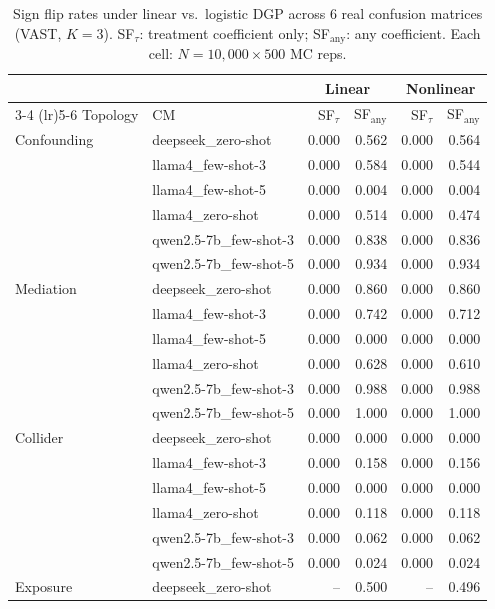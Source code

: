 \begin{table}[t]
\centering
\caption{Sign flip rates under linear vs.\ logistic DGP across 6 real confusion matrices (VAST, $K\!=\!3$). SF$_\tau$: treatment coefficient only; SF$_\text{any}$: any coefficient. Each cell: $N\!=\!10{,}000 \times 500$ MC reps.}
\label{tab:logistic-robustness}
\small\setlength{\tabcolsep}{3pt}
\begin{tabular}{llrrrr}
\toprule
 & & \multicolumn{2}{c}{Linear} & \multicolumn{2}{c}{Nonlinear} \\
\cmidrule(lr){3-4} \cmidrule(lr){5-6}
Topology & CM & SF$_\tau$ & SF$_\text{any}$ & SF$_\tau$ & SF$_\text{any}$ \\
\midrule
Confounding & deepseek\_zero-shot & 0.000 & 0.562 & 0.000 & 0.564 \\
 & llama4\_few-shot-3 & 0.000 & 0.584 & 0.000 & 0.544 \\
 & llama4\_few-shot-5 & 0.000 & 0.004 & 0.000 & 0.004 \\
 & llama4\_zero-shot & 0.000 & 0.514 & 0.000 & 0.474 \\
 & qwen2.5-7b\_few-shot-3 & 0.000 & 0.838 & 0.000 & 0.836 \\
 & qwen2.5-7b\_few-shot-5 & 0.000 & 0.934 & 0.000 & 0.934 \\
\midrule
Mediation & deepseek\_zero-shot & 0.000 & 0.860 & 0.000 & 0.860 \\
 & llama4\_few-shot-3 & 0.000 & 0.742 & 0.000 & 0.712 \\
 & llama4\_few-shot-5 & 0.000 & 0.000 & 0.000 & 0.000 \\
 & llama4\_zero-shot & 0.000 & 0.628 & 0.000 & 0.610 \\
 & qwen2.5-7b\_few-shot-3 & 0.000 & 0.988 & 0.000 & 0.988 \\
 & qwen2.5-7b\_few-shot-5 & 0.000 & 1.000 & 0.000 & 1.000 \\
\midrule
Collider & deepseek\_zero-shot & 0.000 & 0.000 & 0.000 & 0.000 \\
 & llama4\_few-shot-3 & 0.000 & 0.158 & 0.000 & 0.156 \\
 & llama4\_few-shot-5 & 0.000 & 0.000 & 0.000 & 0.000 \\
 & llama4\_zero-shot & 0.000 & 0.118 & 0.000 & 0.118 \\
 & qwen2.5-7b\_few-shot-3 & 0.000 & 0.062 & 0.000 & 0.062 \\
 & qwen2.5-7b\_few-shot-5 & 0.000 & 0.024 & 0.000 & 0.024 \\
\midrule
Exposure & deepseek\_zero-shot & -- & 0.500 & -- & 0.496 \\

\end{tabular}
\end{table}
